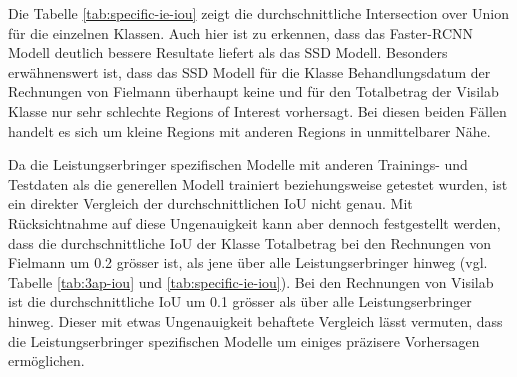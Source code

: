 Die Tabelle \ref{tab:specific-ie-iou} zeigt die durchschnittliche Intersection over Union für die einzelnen Klassen. Auch hier ist zu erkennen, dass das Faster-RCNN Modell deutlich bessere Resultate liefert als das SSD Modell. Besonders erwähnenswert ist, dass das SSD Modell für die Klasse Behandlungsdatum der Rechnungen von Fielmann überhaupt keine und für den Totalbetrag der Visilab Klasse nur sehr schlechte Regions of Interest vorhersagt. Bei diesen beiden Fällen handelt es sich um kleine Regions mit anderen Regions in unmittelbarer Nähe.

Da die Leistungserbringer spezifischen Modelle mit anderen Trainings- und Testdaten als die generellen Modell trainiert beziehungsweise getestet wurden, ist ein direkter Vergleich der durchschnittlichen IoU nicht genau. Mit Rücksichtnahme auf diese Ungenauigkeit kann aber dennoch festgestellt werden, dass die durchschnittliche IoU der Klasse Totalbetrag bei den Rechnungen von Fielmann um 0.2 grösser ist, als jene über alle Leistungserbringer hinweg (vgl. Tabelle \ref{tab:3ap-iou} und \ref{tab:specific-ie-iou}). Bei den Rechnungen von Visilab ist die durchschnittliche IoU um 0.1 grösser als über alle Leistungserbringer hinweg. Dieser mit etwas Ungenauigkeit behaftete Vergleich lässt vermuten, dass die Leistungserbringer spezifischen Modelle um einiges präzisere Vorhersagen ermöglichen.

